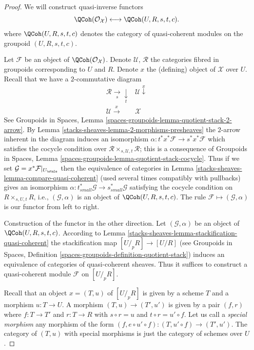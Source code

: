 \begin{proof}
We will construct quasi-inverse functors
$$
\QCoh(\mathcal{O}_\mathcal{X})
\longleftrightarrow
\QCoh(U, R, s, t, c).
$$
where $\QCoh(U, R, s, t, c)$ denotes the category of quasi-coherent modules
on the groupoid $(U, R, s, t, c)$.

\medskip\noindent
Let $\mathcal{F}$ be an object of $\QCoh(\mathcal{O}_\mathcal{X})$.
Denote $\mathcal{U}$, $\mathcal{R}$ the categories fibred in groupoids
corresponding to $U$ and $R$. Denote $x$ the (defining) object of $\mathcal{X}$
over $U$. Recall that we have a $2$-commutative diagram
$$
\begin{array}{cc}\mathcal{R} \underset{s}{\longrightarrow}\underset{t}{\downarrow} & \mathcal{U} \overset{x}{\downarrow} \\ \mathcal{U} \overset{x}{\longrightarrow} & \mathcal{X}\end{array}
$$
See Groupoids in Spaces, Lemma
\ref{spaces-groupoids-lemma-quotient-stack-2-arrow}.
By Lemma \ref{stacks-sheaves-lemma-2-morphisms-presheaves}
the $2$-arrow inherent in the diagram induces an isomorphism
$\alpha : t^*x^*\mathcal{F} \to s^*x^*\mathcal{F}$
which satisfies the cocycle condition over
$\mathcal{R} \times_{s, \mathcal{U}, t} \mathcal{R}$;
this is a consequence of Groupoids in Spaces, Lemma
\ref{spaces-groupoids-lemma-quotient-stack-cocycle}.
Thus if we set $\mathcal{G} = x^*\mathcal{F}|_{U_\etale}$
then the equivalence of categories in
Lemma \ref{stacks-sheaves-lemma-compare-quasi-coherent}
(used several times compatibly with pullbacks)
gives an isomorphism
$\alpha : t_{small}^*\mathcal{G} \to s_{small}^*\mathcal{G}$
satisfying the cocycle condition on $R \times_{s, U, t} R$, i.e.,
$(\mathcal{G}, \alpha)$ is an object of $\QCoh(U, R, s, t, c)$.
The rule $\mathcal{F} \mapsto (\mathcal{G}, \alpha)$ is our
functor from left to right.

\medskip\noindent
Construction of the functor in the other direction.
Let $(\mathcal{G}, \alpha)$ be an object of $\QCoh(U, R, s, t, c)$.
According to Lemma \ref{stacks-sheaves-lemma-stackification-quasi-coherent}
the stackification map $[U/_{\!p}R] \to [U/R]$ (see
Groupoids in Spaces, Definition
\ref{spaces-groupoids-definition-quotient-stack})
induces an equivalence of categories of quasi-coherent sheaves.
Thus it suffices to construct a quasi-coherent module $\mathcal{F}$
on $[U/_{\!p}R]$.

\medskip\noindent
Recall that an object $x = (T, u)$ of $[U/_{\!p}R]$
is given by a scheme $T$ and a morphism $u : T \to U$. A morphism
$(T, u) \to (T', u')$ is given by a pair $(f, r)$ where $f : T \to T'$
and $r : T \to R$ with $s \circ r = u$ and $t \circ r = u' \circ f$.
Let us call a {\it special morphism} any morphism of the form
$(f, e \circ u' \circ f) : (T, u' \circ f) \to (T', u')$.
The category of $(T, u)$ with special morphisms is just the
category of schemes over $U$.


\end{proof}
